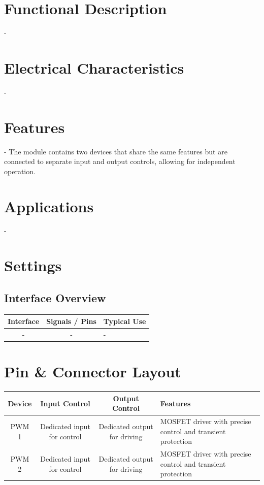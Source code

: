 \documentclass[10pt]{article}
\begin{document}
\section*{Functional Description}
-\\ 

\section*{Electrical Characteristics}
-\\ 

\section*{Features}
- The module contains two devices that share the same features but are connected to separate input and output controls, allowing for independent operation.\\ 



\section*{Applications}
-\\ 

\vspace{1em}

\section*{Settings}

\subsection*{Interface Overview}
\begin{tabularx}{\textwidth}{|c|c|>{\RaggedRight\arraybackslash}X|}
\hline
\rowcolor{headergray}
Interface & Signals / Pins & Typical Use \\
\hline
- & - & - \\
\hline
\end{tabularx}


\section*{Pin \& Connector Layout}
\begin{tabularx}{\textwidth}{|c|c|c|>{\RaggedRight\arraybackslash}X|}
\hline
\rowcolor{headergray}
Device & Input Control & Output Control & Features \\
\hline
PWM 1 & Dedicated input for control & Dedicated output for driving & MOSFET driver with precise control and transient protection \\
PWM 2 & Dedicated input for control & Dedicated output for driving & MOSFET driver with precise control and transient protection \\
\hline
\end{tabularx}
\end{document}
